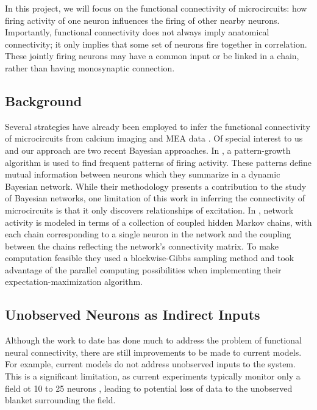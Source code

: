\documentclass{article}
\begin{document}
In this project, we will focus on the functional connectivity of
microcircuits: how firing activity of one neuron influences the
firing of other nearby neurons.  Importantly, functional connectivity
does not always imply anatomical connectivity; it only implies that
some set of neurons fire together in correlation.  These jointly
firing neurons may have a common input or be linked in a chain,
rather than having monosynaptic connection.

\subsection{Background}

Several strategies have already been employed to infer the functional
connectivity of microcircuits from calcium imaging and MEA data
\citep{Gerwinn2010, takahashi2007, aguiar2009}. Of special interest
to us and our approach are two recent Bayesian approaches. In
\citep{patnaik2011}, a pattern-growth algorithm is used to find
frequent patterns of firing activity. These patterns define mutual
information between neurons which they summarize in a dynamic
Bayesian network. While their methodology presents a contribution
to the study of Bayesian networks, one limitation of this work in
inferring the connectivity of microcircuits is that it only discovers
relationships of excitation. In \citep{mishchencko2011}, network
activity is modeled in terms of a collection of coupled hidden
Markov chains, with each chain corresponding to a single neuron in
the network and the coupling between the chains reflecting the
network’s connectivity matrix.  To make computation feasible they
used a blockwise-Gibbs sampling method and took advantage of the
parallel computing possibilities when implementing their
expectation-maximization algorithm.

\subsection{Unobserved Neurons as Indirect Inputs}

Although the work to date has done much to address the problem of
functional neural connectivity, there are still improvements to be
made to current models. For example, current models do not address
unobserved inputs to the system. This is a significant limitation,
as current experiments typically monitor only a field ot 10 to 25 
neurons \citep{mishchencko2011}, leading to potential loss of data
to the unobserved blanket surrounding the field.
\end{document}

